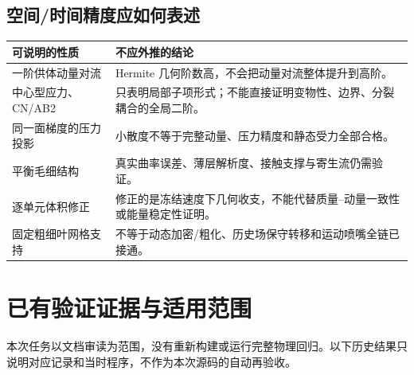 \documentclass[UTF8,a4paper,11pt,fontset=fandol]{ctexart}
\begin{document}
\subsection{空间/时间精度应如何表述}
\begin{longtable}{@{}>{\raggedright\arraybackslash}p{}p{}@{}}
\toprule 可说明的性质 & 不应外推的结论\\\midrule\endhead
一阶供体动量对流 & Hermite 几何阶数高，不会把动量对流整体提升到高阶。\\
中心型应力、CN/AB2 & 只表明局部子项形式；不能直接证明变物性、边界、分裂耦合的全局二阶。\\
同一面梯度的压力投影 & 小散度不等于完整动量、压力精度和静态受力全部合格。\\
平衡毛细结构 & 真实曲率误差、薄层解析度、接触支撑与寄生流仍需验证。\\
逐单元体积修正 & 修正的是冻结速度下几何收支，不能代替质量--动量一致性或能量稳定性证明。\\
固定粗细叶网格支持 & 不等于动态加密/粗化、历史场保守转移和运动喷嘴全链已接通。\\
\bottomrule
\end{longtable}

\section{已有验证证据与适用范围}
本次任务以文档审读为范围，没有重新构建或运行完整物理回归。以下历史结果只说明对应记录和当时程序，不作为本次源码的自动再验收。
\end{document}
